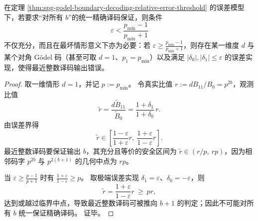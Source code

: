 \begin{proposition}\label{prop:spg-relative-error-threshold-sharpness}
在定理 \ref{thm:spg-godel-boundary-decoding-relative-error-threshold} 的误差模型下，若要求“对所有 \(b\)”的统一精确译码保证，则条件
\[
\varepsilon<\frac{p_{\min}-1}{p_{\min}+1}
\]
不仅充分，而且在最坏情形意义下亦为必要：若 \(\varepsilon\ge \frac{p_{\min}-1}{p_{\min}+1}\)，则存在某一维度 \(d\) 与某个对角 Gödel 码（甚至可取 \(d=1\)、\(p_1=p_{\min}\)）以及满足 \(|\delta_0|,|\delta_1|\le\varepsilon\) 的误差实现，使得最近整数译码输出错误。
\end{proposition}
\begin{proof}
取一维情形 \(d=1\)，并记 \(p:=p_{\min}\)。
令真实比值 \(r:=dB_{11}/B_0=p^{2b}\)，观测比值
\[
\widetilde r=\frac{d\widetilde B_{11}}{\widetilde B_0}
=\frac{1+\delta_1}{1+\delta_0}\,r.
\]
由误差界得
\[
\widetilde r\in\left[\frac{1-\varepsilon}{1+\varepsilon}r,\ \frac{1+\varepsilon}{1-\varepsilon}r\right].
\]
最近整数译码要保证输出 \(b\)，其充分且等价的安全区间为 \(\widetilde r\in(r/p,\ rp)\)，因为相邻码字 \(p^{2b}\) 与 \(p^{2(b+1)}\) 的几何中点为 \(rp\)。
\par
当 \(\varepsilon\ge \frac{p-1}{p+1}\) 时有 \(\frac{1+\varepsilon}{1-\varepsilon}\ge p\)。
取极端误差实现 \(\delta_1=\varepsilon\)、\(\delta_0=-\varepsilon\)，则
\[
\widetilde r=\frac{1+\varepsilon}{1-\varepsilon}r\ \ge\ pr,
\]
达到或越过临界中点，导致最近整数译码可被推向 \(b+1\) 的判定；因此不可能对所有 \(b\) 统一保证精确译码。
证毕。
\end{proof}

\endinput

